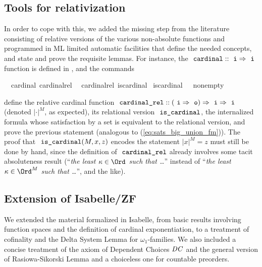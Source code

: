 \subsection{Tools for relativization}
\label{sec:tools-relativization}
In order to cope with this, we added the missing step from the
literature consisting of relative versions of the various non-absolute
functions and programmed in ML limited automatic facilities that
define the needed concepts, and  state and
prove the requisite lemmas. For instance, the 
$\isatt{cardinal}::\tyi \fun \tyi$ function is defined in
, and the commands
\begin{isabelle}
  \isamarkupfalse%
  \ \ {\isachardoublequoteopen}cardinal{\isachardoublequoteclose}\ {\isachardoublequoteopen}cardinal{\isacharunderscore}{\kern0pt}rel{\isachardoublequoteclose}\ \isanewline
  \isamarkupfalse%
  \ {\isachardoublequoteopen}cardinal{\isacharunderscore}{\kern0pt}rel{\isachardoublequoteclose}\ {\isachardoublequoteopen}is{\isacharunderscore}{\kern0pt}cardinal{\isachardoublequoteclose}\isanewline
  \isamarkupfalse%
  \ {\isachardoublequoteopen}is{\isacharunderscore}{\kern0pt}cardinal{\isachardoublequoteclose}\ \ \ {\isachardoublequoteopen}nonempty{\isachardoublequoteclose}%
\end{isabelle}
define the relative cardinal function
$\isatt{cardinal{\uscore}rel}::(\tyi \fun \tyo) \fun \tyi \fun\tyi$
(denoted  $|\cdot|^M$, as expected),
its relational version $\isatt{is{\uscore}cardinal}$, the
internalized formula  whose
satisfaction by a set is equivalent to the relational version, and
prove the previous statement (analogous to (\ref{eq:sats_big_union_fm})).
The proof that $\isatt{is{\uscore}cardinal}(M,x,z)$  encodes the
statement $|x|^M = z$ must still be done by hand, since the definition
of $\isatt{cardinal{\uscore}rel}$ already involves some tacit
absoluteness result (“\textit{the least $\ka \in \Ord$ such that \dots}” instead
of “\textit{the least $\ka \in \Ord^M$ such that \dots}”, and the like).

\subsection{Extension of Isabelle/ZF}
\label{sec:extension-isabellezf}
We extended \cite{Delta_System_Lemma-AFP} the material formalized in
Isabelle, from basic results involving function spaces and the
definition of cardinal exponentiation, to a treatment of cofinality
and the Delta System Lemma for $\omega_1$-families. We also included a
concise treatment of the axiom of Dependent Choices $\mathit{DC}$ and the
general version of Rasiowa-Sikorski Lemma \cite{2018arXiv180705174G}
and a choiceless one for countable preorders.

